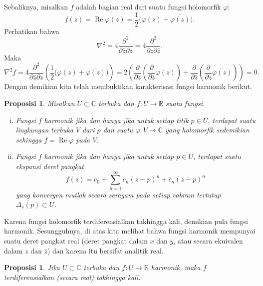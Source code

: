 \documentclass[12pt,openany]{book}
\renewcommand{\Re}{\operatorname{Re}}
\newcommand{\C}{{\mathbb{C}}}
\newcommand{\R}{{\mathbb{R}}}
\theoremstyle{plain}
\newtheorem{prop}[thm]{Proposisi}
\theoremstyle{remark}
\theoremstyle{definition}
\theoremstyle{exercise}
\theoremstyle{example}
\begin{document}
Sebaliknya,
misalkan $f$ adalah bagian real dari suatu fungsi holomorfik $\varphi$:
\begin{equation*}
f(z) = \Re \varphi(z) =
\frac{1}{2}\bigl( \varphi(z) + \overline{\varphi(z)} \bigr) .
\end{equation*}
Perhatikan bahwa
\begin{equation*}
\nabla^2 =
4 \frac{\partial^2}{\partial \bar{z} \partial z}
=
4 \frac{\partial^2}{\partial z \partial \bar{z}} .
\end{equation*}
Maka
\begin{equation*}
\nabla^2 f =
4 \frac{\partial^2}{\partial \bar{z} \partial z}
\left(
\frac{1}{2}\bigl( \varphi(z) + \overline{\varphi(z)} \bigr)
\right)
=
2
\left(
\frac{\partial}{\partial z}
\left(
\frac{\partial}{\partial \bar{z}}
\varphi(z)
\right)+
\frac{\partial}{\partial \bar{z}}
\left(
\frac{\partial}{\partial z}
\overline{\varphi(z)}
\right)
\right)
=
0 .
\end{equation*}
Dengan demikian kita telah membuktikan karakterisasi fungsi
harmonik berikut.

\begin{prop} \label{prop:harmanal}
Misalkan $U \subset \C$ terbuka dan $f \colon U \to \R$ suatu fungsi.
\begin{enumerate}[(i)]
\item
Fungsi $f$ harmonik jika dan hanya jika
untuk setiap titik $p \in U$, terdapat suatu lingkungan terbuka $V$ dari $p$ dan suatu
$\varphi \colon V \to \C$ yang holomorfik sedemikian sehingga $f = \Re \varphi$
pada $V$.
\item
Fungsi $f$ harmonik jika dan hanya jika
untuk setiap $p \in U$, terdapat suatu ekspansi deret pangkat
\begin{equation*}
f(z) =
c_0
+
\sum_{n=1}^\infty c_n {(z-p)}^n + \bar{c}_n {(\overline{z-p})}^n
\end{equation*}
yang konvergen mutlak secara seragam
pada setiap cakram tertutup $\overline{\Delta_r(p)} \subset U$.
\end{enumerate}
\end{prop}

Karena fungsi holomorfik
terdiferensialkan takhingga kali, demikian pula fungsi harmonik.
Sesungguhnya, di atas kita melihat bahwa fungsi harmonik mempunyai suatu deret pangkat real
(deret pangkat dalam $x$ dan $y$, atau secara ekuivalen dalam $z$ dan $\bar{z}$)
dan karena itu bersifat analitik real.

\begin{prop}
Jika $U \subset \C$ terbuka dan $f \colon U \to \R$ harmonik, maka $f$ terdiferensialkan (secara real) takhingga kali.
\end{prop}
\end{document}
